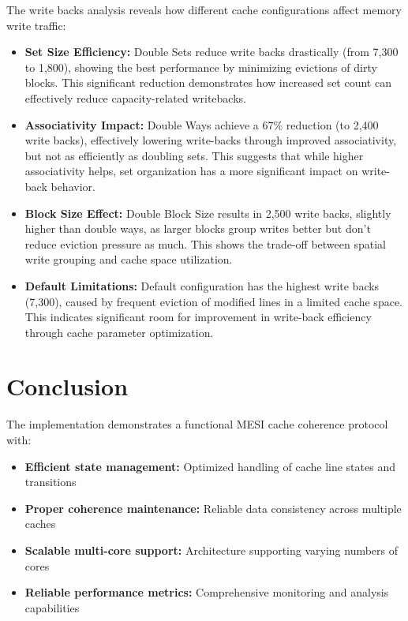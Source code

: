 \documentclass[10pt]{article}
\begin{document}
The write backs analysis reveals how different cache configurations affect memory write traffic:

\begin{itemize}
    \item \textbf{Set Size Efficiency:} Double Sets reduce write backs drastically (from 7,300 to 1,800), showing the best performance by minimizing evictions of dirty blocks. This significant reduction demonstrates how increased set count can effectively reduce capacity-related writebacks.
    
    \item \textbf{Associativity Impact:} Double Ways achieve a 67\% reduction (to 2,400 write backs), effectively lowering write-backs through improved associativity, but not as efficiently as doubling sets. This suggests that while higher associativity helps, set organization has a more significant impact on write-back behavior.
    
    \item \textbf{Block Size Effect:} Double Block Size results in 2,500 write backs, slightly higher than double ways, as larger blocks group writes better but don't reduce eviction pressure as much. This shows the trade-off between spatial write grouping and cache space utilization.
    
    \item \textbf{Default Limitations:} Default configuration has the highest write backs (7,300), caused by frequent eviction of modified lines in a limited cache space. This indicates significant room for improvement in write-back efficiency through cache parameter optimization.
\end{itemize}




\section{Conclusion}
The implementation demonstrates a functional MESI cache coherence protocol with:
\begin{itemize}
    \item \textbf{Efficient state management:} Optimized handling of cache line states and transitions
    \item \textbf{Proper coherence maintenance:} Reliable data consistency across multiple caches
    \item \textbf{Scalable multi-core support:} Architecture supporting varying numbers of cores
    \item \textbf{Reliable performance metrics:} Comprehensive monitoring and analysis capabilities
\end{itemize}
\end{document}
